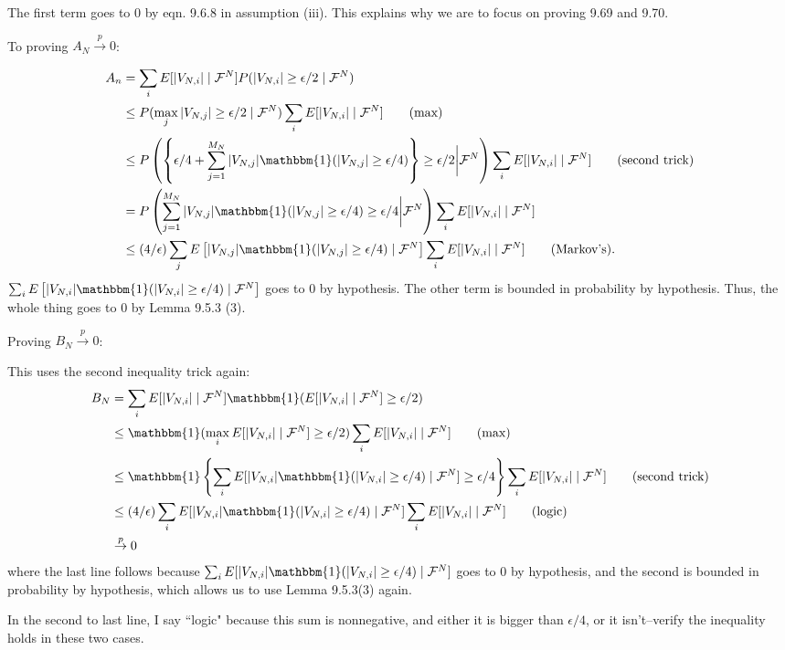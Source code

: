 \documentclass{article}
\begin{document}
The first term goes to $0$ by eqn. 9.6.8 in assumption (iii). This explains why we are to focus on proving 9.69 and 9.70. 
\newline

To proving $A_N \overset{p}{\to} 0$: 

\begin{align*}
A_n &= \sum_i E[ | V_{N,i}|  \mid \mathcal{F}^N] P(|V_{N,i}| \ge \epsilon/2 \mid \mathcal{F}^N ) \\
&\le P(\max_j |V_{N,j}| \ge \epsilon/2 \mid \mathcal{F}^N ) \sum_i E[ | V_{N,i}|  \mid \mathcal{F}^N] \tag{max} \\
&\le P\left( \left\{ \epsilon/4 + \sum_{j=1}^{M_N} |V_{N,j}| \mathbbm{1}(|V_{N,j}| \ge \epsilon/4) \right\}  \ge \epsilon/2 \bigg\rvert \mathcal{F}^N \right) \sum_i E[ | V_{N,i}|  \mid \mathcal{F}^N]  \tag{second trick} \\
&= P\left( \sum_{j=1}^{M_N} |V_{N,j}| \mathbbm{1}(|V_{N,j}| \ge \epsilon/4)   \ge \epsilon/4 \bigg\rvert \mathcal{F}^N \right) \sum_i E[ | V_{N,i}|  \mid \mathcal{F}^N]   \\
&\le (4/ \epsilon) \sum_j E\left[ |V_{N,j}| \mathbbm{1}(|V_{N,j}| \ge \epsilon/4) \mid \mathcal{F}^N \right]  \sum_i E[ | V_{N,i}|  \mid \mathcal{F}^N]  \tag{Markov's}.
\end{align*}
$\sum_i E\left[ |V_{N,i}| \mathbbm{1}(|V_{N,i}| \ge \epsilon/4) \mid \mathcal{F}^N \right]$ goes to $0$ by hypothesis. The other term is bounded in probability by hypothesis. Thus, the whole thing goes to $0$ by Lemma 9.5.3 (3).

Proving $B_N \overset{p}{\to} 0$: 
\newline

This uses the second inequality trick again:
\begin{align*}
B_N &=   \sum_i E[ | V_{N,i}|  \mid \mathcal{F}^N]  \mathbbm{1}( E[|V_{N,i}| \mid \mathcal{F}^N ] \ge \epsilon/2) \\
&\le  \mathbbm{1}( \max_i E[|V_{N,i}| \mid \mathcal{F}^N ] \ge \epsilon/2) \sum_i E[ | V_{N,i}|  \mid \mathcal{F}^N] \tag{max} \\
&\le  \mathbbm{1} \left\{ \sum_i E[|V_{N,i}| \mathbbm{1}(| V_{N,i} |\ge \epsilon/4) \mid \mathcal{F}^N ] \ge \epsilon/4 \right\}\sum_i E[ | V_{N,i}|  \mid \mathcal{F}^N]  \tag{second trick} \\
&\le (4/\epsilon) \sum_i E[|V_{N,i}| \mathbbm{1}(| V_{N,i} |\ge \epsilon/4) \mid \mathcal{F}^N ]  \sum_i E[ | V_{N,i}|  \mid \mathcal{F}^N] \tag{logic} \\
&\overset{p}{\to} 0
\end{align*}
where the last line follows because $\sum_i E[|V_{N,i}| \mathbbm{1}(| V_{N,i} |\ge \epsilon/4) \mid \mathcal{F}^N ]$ goes to $0$ by hypothesis, and the second is bounded in probability by hypothesis, which allows us to use Lemma 9.5.3(3) again. 

In the second to last line, I say ``logic" because this sum is nonnegative, and either it is bigger than $\epsilon/4$, or it isn't--verify the inequality holds in these two cases. 
\end{document}
